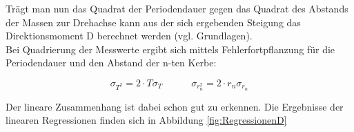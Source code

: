 \documentclass[12pt,a4paper]{article}
\begin{document}
Trägt man nun das Quadrat der Periodendauer gegen das Quadrat des Abstands der Massen zur Drehachse kann aus der sich ergebenden Steigung das Direktionsmoment D berechnet werden (vgl. Grundlagen).\\

Bei Quadrierung der Messwerte ergibt sich mittels Fehlerfortpflanzung für die Periodendauer und den Abstand der n-ten Kerbe:

\begin{equation}
\sigma_{T^2}=2\cdot T \sigma_T \quad \quad \quad \sigma_{r_n^2}=2\cdot r_n \sigma_{r_n}
\end{equation}

Der lineare Zusammenhang ist dabei schon gut zu erkennen. Die Ergebnisse der linearen Regressionen finden sich in Abbildung \ref{fig:RegressionenD}
\end{document}
